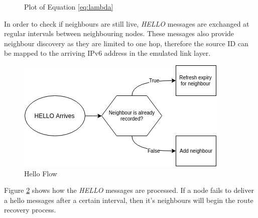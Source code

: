 \documentclass[12pt]{article}
\begin{document}
\begin{figure}[h]
	\centering
	   \caption{Plot of Equation \ref{eq:lambda}}
	\label{fig:lambda}
\end{figure}

In order to check if neighbours are still live, \emph{HELLO} messages are exchanged at regular intervals between neighbouring nodes. These messages also provide neighbour discovery as they are limited to one hop, therefore the source ID can be mapped to the arriving IPv6 address in the emulated link layer. 

\begin{figure}[!ht]
	\centering
	\includegraphics[width=0.6\linewidth]{images/helloflow}
	\caption{Hello Flow}
	\label{fig:helloflow}
\end{figure}

Figure \ref{fig:helloflow} shows how the \emph{HELLO} messages are processed. If a node fails to deliver a hello messages after a certain interval, then it's neighbours will begin the route recovery process.
\end{document}
